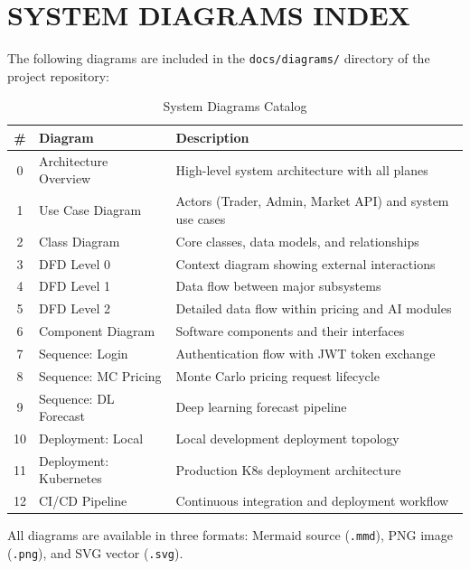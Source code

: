 \documentclass[12pt,a4paper]{report}
\begin{document}

\chapter{SYSTEM DIAGRAMS INDEX}

The following diagrams are included in the \texttt{docs/diagrams/} directory of the project repository:

\begin{table}[H]
\centering
\caption{System Diagrams Catalog}
\label{tab:diagrams}
\begin{tabularx}{\textwidth}{|c|l|X|}
\hline
\textbf{\#} & \textbf{Diagram} & \textbf{Description} \\
\hline
0 & Architecture Overview & High-level system architecture with all planes \\
\hline
1 & Use Case Diagram & Actors (Trader, Admin, Market API) and system use cases \\
\hline
2 & Class Diagram & Core classes, data models, and relationships \\
\hline
3 & DFD Level 0 & Context diagram showing external interactions \\
\hline
4 & DFD Level 1 & Data flow between major subsystems \\
\hline
5 & DFD Level 2 & Detailed data flow within pricing and AI modules \\
\hline
6 & Component Diagram & Software components and their interfaces \\
\hline
7 & Sequence: Login & Authentication flow with JWT token exchange \\
\hline
8 & Sequence: MC Pricing & Monte Carlo pricing request lifecycle \\
\hline
9 & Sequence: DL Forecast & Deep learning forecast pipeline \\
\hline
10 & Deployment: Local & Local development deployment topology \\
\hline
11 & Deployment: Kubernetes & Production K8s deployment architecture \\
\hline
12 & CI/CD Pipeline & Continuous integration and deployment workflow \\
\hline
\end{tabularx}
\end{table}

All diagrams are available in three formats: Mermaid source (\texttt{.mmd}), PNG image (\texttt{.png}), and SVG vector (\texttt{.svg}).
\end{document}
